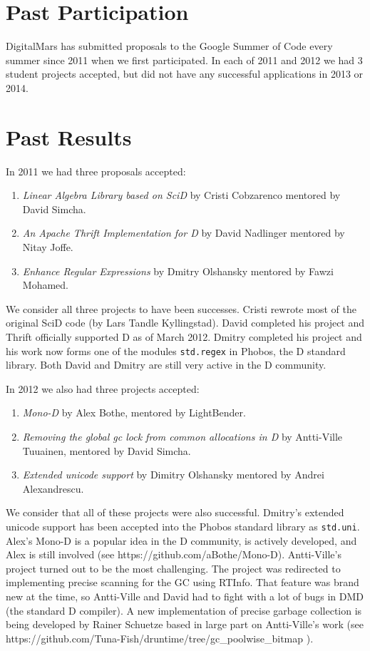 \documentclass[a4paper,12pt]{article}
\begin{document}
\section{Past Participation}

DigitalMars has submitted proposals to the Google Summer of Code every
summer since 2011 when we first participated. In each of 2011 and 2012
we had 3 student projects accepted, but did not have any successful 
applications in 2013 or 2014.

\section{Past Results}

In 2011 we had three proposals accepted:

\begin{enumerate}
\item \emph{Linear Algebra Library based on SciD} by Cristi Cobzarenco 
 mentored by David Simcha.
\item \emph{An Apache Thrift Implementation for D} by David Nadlinger mentored 
by Nitay Joffe.
\item \emph{Enhance Regular Expressions} by Dmitry Olshansky mentored by
Fawzi Mohamed.
\end{enumerate}

We consider all three projects to have been successes. Cristi rewrote most of the 
original SciD code (by Lars Tandle Kyllingstad).  David completed his project 
and Thrift officially supported D as of March 2012.  Dmitry completed his project 
and his work  now forms one of the modules \texttt{std.regex} in Phobos, the D 
standard library. Both David and Dmitry are still very active in the D community.

In 2012 we also had three projects accepted:

\begin{enumerate}
  \item \emph{Mono-D} by Alex Bothe, mentored by LightBender.
  \item \emph{Removing the global gc lock from common allocations in D} by 
  Antti-Ville Tuuainen, mentored by David Simcha.
  \item \emph{Extended unicode support} by Dimitry Olshansky mentored by
  Andrei Alexandrescu.
\end{enumerate}

We consider that all of these projects were also successful.  Dmitry's extended
unicode support has been accepted into the Phobos standard library as \texttt{std.uni}.
Alex's Mono-D is a popular idea in the D community, is actively developed, and 
Alex is still involved (see https://github.com/aBothe/Mono-D). Antti-Ville's project
turned out to be the most challenging.  The project was redirected to implementing
precise scanning for the GC using RTInfo.  That feature was brand new at the time, so
Antti-Ville and David had to fight with a lot of bugs in DMD (the standard D compiler).
A new implementation of precise garbage collection is being developed by Rainer Schuetze
based in large part on Antti-Ville's work (see 
https://github.com/Tuna-Fish/druntime/tree/gc\_poolwise\_bitmap ).
\end{document}
